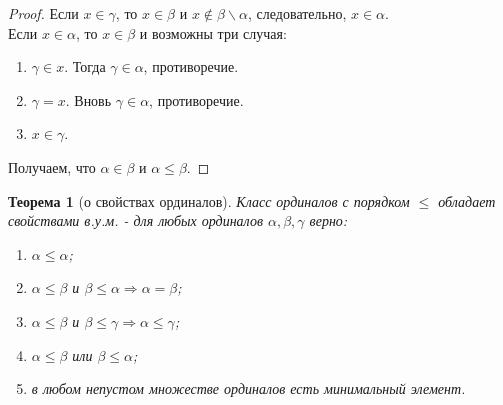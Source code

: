 \documentclass[a4paper]{article}
\newtheorem*{theorem*}{Теорема}
\theoremstyle{definition}
\begin{document}
\begin{enumerate}
\begin{proof}
        Если $x \in \gamma$, то $x \in \beta$ и $x \notin \beta \backslash \alpha$, следовательно, $x\in \alpha$. \\
        Если $x \in \alpha$, то $x \in \beta$ и возможны три случая:
        \begin{enumerate}
         \item $\gamma \in x$. Тогда $\gamma \in \alpha$, противоречие.
         \item $\gamma = x$. Вновь $\gamma \in \alpha$, противоречие.
         \item $x \in \gamma$.
        \end{enumerate}
        Получаем, что $\alpha \in \beta$ и $\alpha \leq \beta$.
       \end{proof}

       \begin{theorem*}[о свойствах ординалов]
        Класс ординалов с порядком $\leq$ обладает свойствами в.у.м. - для любых ординалов $\alpha, \beta, \gamma$ верно:
        \begin{enumerate}
         \item $\alpha \leq \alpha$;
         \item $\alpha \leq \beta$ и $\beta \leq \alpha \Rightarrow \alpha = \beta$;
         \item $\alpha \leq \beta$ и $\beta \leq \gamma \Rightarrow \alpha \leq \gamma$;
         \item $\alpha \leq \beta$ или $\beta \leq \alpha$;
         \item в любом непустом множестве ординалов есть минимальный элемент.
        \end{enumerate}
       \end{theorem*}


\end{enumerate}
\end{document}
